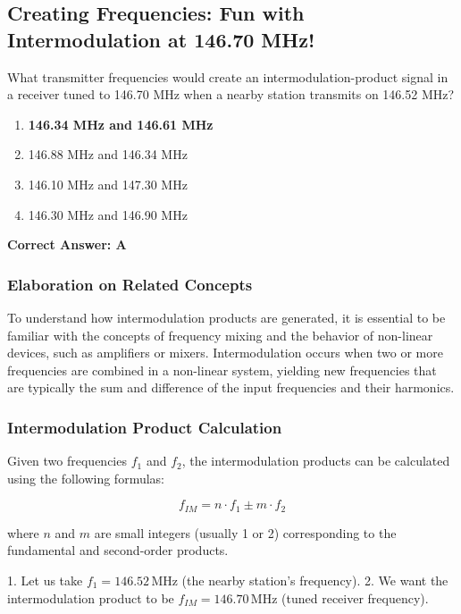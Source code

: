 \subsection{Creating Frequencies: Fun with Intermodulation at 146.70 MHz!}

\begin{tcolorbox}[colback=gray!10, colframe=black, title=E4D05] 

What transmitter frequencies would create an intermodulation-product signal in a receiver tuned to 146.70 MHz when a nearby station transmits on 146.52 MHz?

\begin{enumerate}[label=\Alph*.]
    \item \textbf{146.34 MHz and 146.61 MHz}
    \item 146.88 MHz and 146.34 MHz
    \item 146.10 MHz and 147.30 MHz
    \item 146.30 MHz and 146.90 MHz
\end{enumerate} \end{tcolorbox}

\textbf{Correct Answer: A}

\subsubsection*{Elaboration on Related Concepts}

To understand how intermodulation products are generated, it is essential to be familiar with the concepts of frequency mixing and the behavior of non-linear devices, such as amplifiers or mixers. Intermodulation occurs when two or more frequencies are combined in a non-linear system, yielding new frequencies that are typically the sum and difference of the input frequencies and their harmonics.

\subsubsection*{Intermodulation Product Calculation}

Given two frequencies \( f_1 \) and \( f_2 \), the intermodulation products can be calculated using the following formulas:

\[
f_{IM} = n \cdot f_1 \pm m \cdot f_2
\]

where \( n \) and \( m \) are small integers (usually 1 or 2) corresponding to the fundamental and second-order products.

1. Let us take \( f_1 = 146.52 \, \text{MHz} \) (the nearby station's frequency).
2. We want the intermodulation product to be \( f_{IM} = 146.70 \, \text{MHz} \) (tuned receiver frequency).

